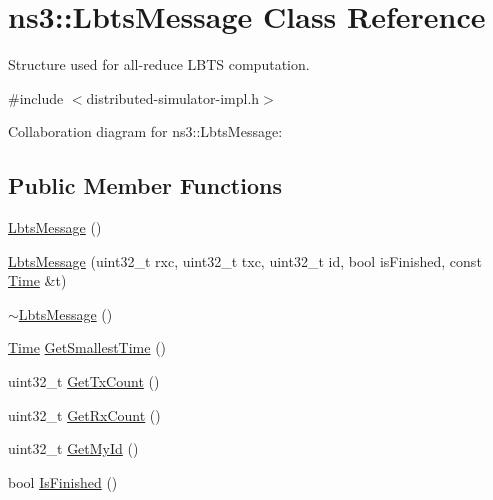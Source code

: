 \hypertarget{classns3_1_1LbtsMessage}{}\section{ns3\+:\+:Lbts\+Message Class Reference}
\label{classns3_1_1LbtsMessage}


Structure used for all-\/reduce L\+B\+TS computation.  




{\ttfamily \#include $<$distributed-\/simulator-\/impl.\+h$>$}



Collaboration diagram for ns3\+:\+:Lbts\+Message\+:
\subsection*{Public Member Functions}
\begin{DoxyCompactItemize}
\item 
\hyperlink{classns3_1_1LbtsMessage_a03a824b6b75e8aaf599a8c09430b7487}{Lbts\+Message} ()
\item 
\hyperlink{classns3_1_1LbtsMessage_af276844c475b7fd3bcfffc8bcb27e61a}{Lbts\+Message} (uint32\+\_\+t rxc, uint32\+\_\+t txc, uint32\+\_\+t id, bool is\+Finished, const \hyperlink{classns3_1_1Time}{Time} \&t)
\item 
\hyperlink{classns3_1_1LbtsMessage_ad4356fbb83f899e0a6c35d79c537cc21}{$\sim$\+Lbts\+Message} ()
\item 
\hyperlink{classns3_1_1Time}{Time} \hyperlink{classns3_1_1LbtsMessage_ae55954da6038045d22fc272bb48611b2}{Get\+Smallest\+Time} ()
\item 
uint32\+\_\+t \hyperlink{classns3_1_1LbtsMessage_a375b9643d5ab856a7b46d740d7a8b4a0}{Get\+Tx\+Count} ()
\item 
uint32\+\_\+t \hyperlink{classns3_1_1LbtsMessage_a16e21f1f46e16bbfa67e7aadc26aef99}{Get\+Rx\+Count} ()
\item 
uint32\+\_\+t \hyperlink{classns3_1_1LbtsMessage_ab44637b75b131b6d1f777803477e5d3b}{Get\+My\+Id} ()
\item 
bool \hyperlink{classns3_1_1LbtsMessage_ac09666d921b4ab6232e0b90090ae1dee}{Is\+Finished} ()
\end{DoxyCompactItemize}
